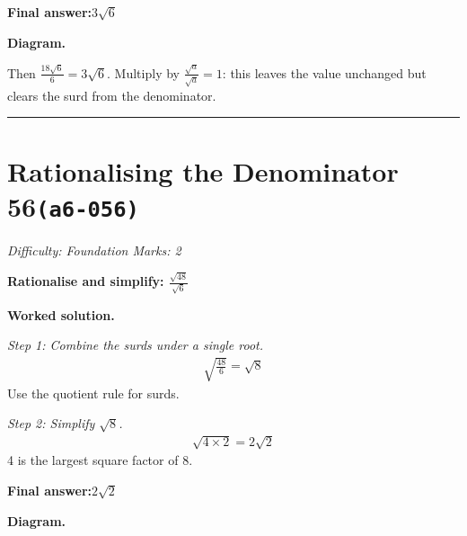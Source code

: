 \documentclass[11pt]{article}
\newcommand{\question}[1]{\par\medskip\noindent\textbf{#1}\par}
\begin{document}
\begin{answerbox}
\textbf{Final answer:}\quad \(\displaystyle 3\sqrt{6}\)
\end{answerbox}
\textbf{Diagram.}

\begin{center}
\end{center}
\small Then $\frac{18\sqrt6}{6}=3\sqrt6$. Multiply by $\frac{\sqrt{a}}{\sqrt{a}}=1$: this leaves the value unchanged but clears the surd from the denominator.\normalsize

\medskip\hrule

\section*{Rationalising the Denominator 56\quad\small\texttt{(a6-056)}}
\textit{Difficulty: Foundation \quad\textbar\quad Marks: 2}

\question{Rationalise and simplify: \( \frac{\sqrt{48}}{\sqrt{6}} \)}

\textbf{Worked solution.}

\textit{Step 1: Combine the surds under a single root.}
\[\begin{gathered}
\sqrt{\frac{48}{6}} = \sqrt{8}
\end{gathered}\]
Use the quotient rule for surds.

\textit{Step 2: Simplify \( \sqrt{8} \).}
\[\begin{gathered}
\sqrt{4 \times 2} = 2\sqrt{2}
\end{gathered}\]
4 is the largest square factor of 8.

\begin{answerbox}
\textbf{Final answer:}\quad \(\displaystyle 2\sqrt{2}\)
\end{answerbox}
\textbf{Diagram.}
\end{document}
